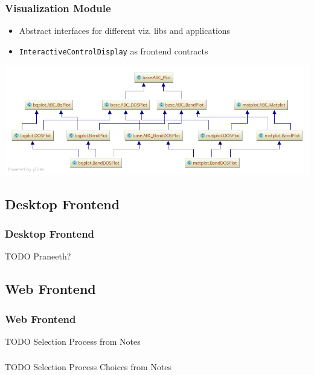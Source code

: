 \documentclass{beamer}
\begin{document}
\renewcommand{\theimage}{\includegraphics[width=1.1\linewidth]{img/pycharm_uml/matplot.png}}%
\begin{frame}\frametitle{Visualization Module}
    \begin{itemize}
    \item Abstract interfaces for different viz. libs and applications
    \item \texttt{InteractiveControlDisplay} as frontend contracts 
    \end{itemize}    
    \centerline{\theimage}
\end{frame}

\subsection{Desktop Frontend}
\label{sec:desktop-frontend}

\begin{frame}\frametitle{Desktop Frontend}
    TODO Praneeth?
\end{frame}

\subsection{Web Frontend}
\label{sec:web-frontend}

\begin{frame}\frametitle{Web Frontend}
    TODO Selection Process from Notes 
\end{frame}

\begin{frame}\frametitle{}
    TODO Selection Process Choices from Notes 
\end{frame}
\end{document}
